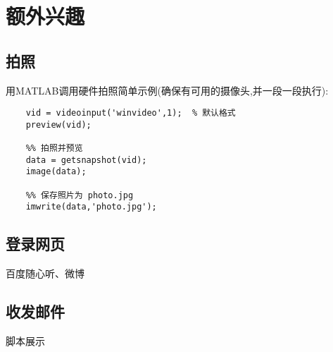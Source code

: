 \section{额外兴趣}

\subsection{拍照}
用MATLAB调用硬件拍照简单示例(确保有可用的摄像头,并一段一段执行):

  \vspace{-0.8cm}
  \begin{lstlisting}[caption = 拍照]
    %% 打开摄像头
    vid = videoinput('winvideo',1);  % 默认格式
    preview(vid);

    %% 拍照并预览
    data = getsnapshot(vid);
    image(data);

    %% 保存照片为 photo.jpg
    imwrite(data,'photo.jpg');
  \end{lstlisting}



\subsection{登录网页}
百度随心听、微博



\subsection{收发邮件}
脚本展示